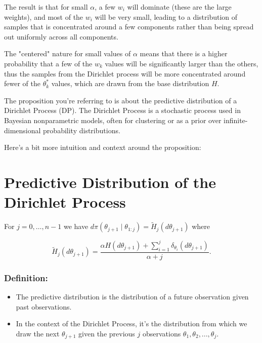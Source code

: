 \documentclass[10pt]{article}
\begin{document}
The result is that for small \( \alpha \), a few \( w_i \) will dominate (these are the large weights), and most of the \( w_i \) will be very small, leading to a distribution of samples that is concentrated around a few components rather than being spread out uniformly across all components.

The "centered" nature for small values of \( \alpha \) means that there is a higher probability that a few of the \( w_k \) values will be significantly larger than the others, thus the samples from the Dirichlet process will be more concentrated around fewer of the \( \theta_k^* \) values, which are drawn from the base distribution \( H \).

The proposition you're referring to is about the predictive distribution of a Dirichlet Process (DP). The Dirichlet Process is a stochastic process used in Bayesian nonparametric models, often for clustering or as a prior over infinite-dimensional probability distributions.

Here's a bit more intuition and context around the proposition:

\section*{Predictive Distribution of the Dirichlet Process}
For $j=0, \ldots, n-1$ we have $d \pi\left(\theta_{j+1} \mid \theta_{1: j}\right)=\tilde{H}_j\left(d \theta_{j+1}\right)$ where

$$
\tilde{H}_j\left(d \theta_{j+1}\right)=\frac{\alpha H\left(d \theta_{j+1}\right)+\sum_{i=1}^j \delta_{\theta_i}\left(d \theta_{j+1}\right)}{\alpha+j} .
$$

\subsubsection*{Definition:}
\begin{itemize}
  \item The predictive distribution is the distribution of a future observation given past observations.
  \item In the context of the Dirichlet Process, it's the distribution from which we draw the next \( \theta_{j+1} \) given the previous \( j \) observations \( \theta_1, \theta_2, ..., \theta_j \).
\end{itemize}
\end{document}
